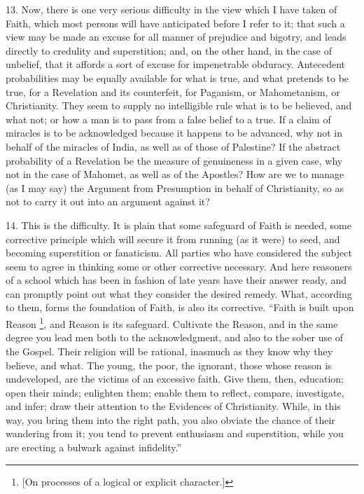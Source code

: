 13. Now, there is one very serious difficulty in the view which I
have taken of Faith, which most persons will have anticipated before I
refer to it; that such a view may be made an excuse for all manner of
prejudice and bigotry, and leads directly to credulity and
superstition; and, on the other hand, in the case of unbelief, that it
affords a sort of excuse for impenetrable obduracy. Antecedent
probabilities may be equally available for what is true, and what
pretends to be true, for a Revelation and its counterfeit, for
Paganism, or Mahometanism, or Christianity. They seem to supply no
intelligible rule what is to be believed, and what not; or how a man
is to pass from a false belief to a true. If a claim of miracles is to
be acknowledged because it happens to be advanced, why not in behalf
of the miracles of India, as well as of those of Palestine? If the
abstract probability of a Revelation be the measure of genuineness in
a given case, why not in the case of Mahomet, as well as of the
Apostles? How are we to manage (as I may say) the Argument from
Presumption in behalf of Christianity, so as not to carry it out into
an argument against it?

14. This is the difficulty. It is plain that some safeguard of
Faith is needed, some corrective principle which will secure it from
running (as it were) to seed, and becoming superstition or fanaticism.
All parties who have considered the subject seem to agree in thinking
some or other corrective necessary. And here reasoners of a school
which has been in fashion of late years have their answer ready, and
can promptly point out what they consider the desired remedy. What,
according to them, forms the foundation of Faith, is also its
corrective. ``Faith is built upon Reason \footnote{[On processes
of a logical or explicit character.]}, and Reason is its safeguard. Cultivate the Reason, and in the
same degree you lead men both to the acknowledgment, and also to the
sober use of the Gospel. Their religion will be rational, inasmuch as
they know why they believe, and what. The young, the poor, the
ignorant, those whose reason is undeveloped, are the victims of an
excessive faith. Give them, then, education; open their minds;
enlighten them; enable them to reflect, compare, investigate, and
infer; draw their attention to the Evidences of Christianity. While,
in this way, you bring them into the right path, you also obviate the
chance of their wandering from it; you tend to prevent enthusiasm and
superstition, while you are erecting a bulwark against
infidelity.''

